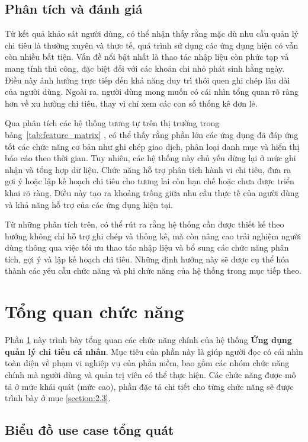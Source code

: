 \documentclass[../DoAn.tex]{subfiles}
\begin{document}
\subsection{Phân tích và đánh giá}

Từ kết quả khảo sát người dùng, có thể nhận thấy rằng mặc dù nhu cầu quản lý chi tiêu là thường xuyên và thực tế, quá trình sử dụng các ứng dụng hiện có vẫn còn nhiều bất tiện. Vấn đề nổi bật nhất là thao tác nhập liệu còn phức tạp và mang tính thủ công, đặc biệt đối với các khoản chi nhỏ phát sinh hằng ngày. Điều này ảnh hưởng trực tiếp đến khả năng duy trì thói quen ghi chép lâu dài của người dùng. Ngoài ra, người dùng mong muốn có cái nhìn tổng quan rõ ràng hơn về xu hướng chi tiêu, thay vì chỉ xem các con số thống kê đơn lẻ.

Qua phân tích các hệ thống tương tự trên thị trường trong bảng~\ref{tab:feature_matrix} , có thể thấy rằng phần lớn các ứng dụng đã đáp ứng tốt các chức năng cơ bản như ghi chép giao dịch, phân loại danh mục và hiển thị báo cáo theo thời gian. Tuy nhiên, các hệ thống này chủ yếu dừng lại ở mức ghi nhận và tổng hợp dữ liệu. Chức năng hỗ trợ phân tích hành vi chi tiêu, đưa ra gợi ý hoặc lập kế hoạch chi tiêu cho tương lai còn hạn chế hoặc chưa được triển khai rõ ràng. Điều này tạo ra khoảng trống giữa nhu cầu thực tế của người dùng và khả năng hỗ trợ của các ứng dụng hiện tại.

Từ những phân tích trên, có thể rút ra rằng hệ thống cần được thiết kế theo hướng không chỉ hỗ trợ ghi chép và thống kê, mà còn nâng cao trải nghiệm người dùng thông qua việc tối ưu thao tác nhập liệu và bổ sung các chức năng phân tích, gợi ý và lập kế hoạch chi tiêu. Những định hướng này sẽ được cụ thể hóa thành các yêu cầu chức năng và phi chức năng của hệ thống trong mục tiếp theo.


\section{Tổng quan chức năng}
\label{section:2.2}

Phần \ref{section:2.2} này trình bày tổng quan các chức năng chính của hệ thống \textbf{Ứng dụng quản lý chi tiêu cá nhân}.  
Mục tiêu của phần này là giúp người đọc có cái nhìn toàn diện về phạm vi nghiệp vụ của phần mềm, bao gồm các nhóm chức năng chính mà người dùng và quản trị viên có thể thực hiện.  
Các chức năng được mô tả ở mức khái quát (mức cao), phần đặc tả chi tiết cho từng chức năng sẽ được trình bày ở mục \ref{section:2.3}.

\subsection{Biểu đồ use case tổng quát}
\label{subsection:2.2.1}
\end{document}
